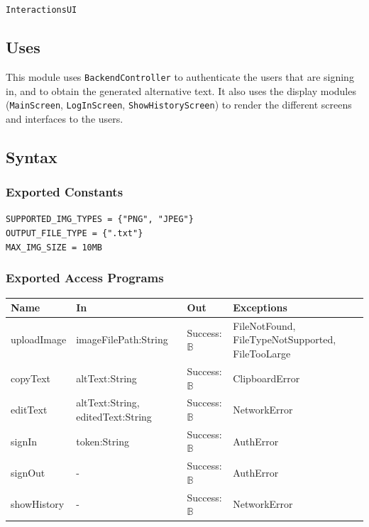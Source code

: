 \documentclass[12pt, titlepage]{article}
\newcommand{\Bool}{\ensuremath{\mathbb{B}}}
\begin{document}
\texttt{InteractionsUI}

\subsection{Uses}
This module uses \texttt{BackendController} to authenticate the users
that are signing in, and to obtain the
generated alternative text. It also uses the display modules
(\texttt{MainScreen}, \texttt{LogInScreen},
\texttt{ShowHistoryScreen}) to render the different screens and
interfaces to the users.

\subsection{Syntax}

\subsubsection{Exported Constants}

\texttt{SUPPORTED\_IMG\_TYPES = \{"PNG", "JPEG"\}}\\
\texttt{OUTPUT\_FILE\_TYPE = \{".txt"\}}\\
\texttt{MAX\_IMG\_SIZE = 10MB}

\subsubsection{Exported Access Programs}

\begin{center}
  \begin{tabular}{p{2.5cm} p{4cm} p{4cm} p{3cm}}
    \hline
    \textbf{Name} & \textbf{In} & \textbf{Out} & \textbf{Exceptions} \\
    \hline
    uploadImage & imageFilePath:String & Success:\Bool &
    FileNotFound, FileTypeNotSupported, FileTooLarge\\
    \hline
    copyText & altText:String & Success:\Bool & ClipboardError \\
    \hline
    editText & altText:String, editedText:String & Success:\Bool &
    NetworkError \\
    \hline
    signIn & token:String & Success:\(\mathbb{B}\) & AuthError \\
    \hline
    signOut & - & Success:\(\mathbb{B}\) & AuthError \\
    \hline
    showHistory & - & Success:\(\mathbb{B}\) & NetworkError \\

    \hline
  \end{tabular}
\end{center}
\end{document}
